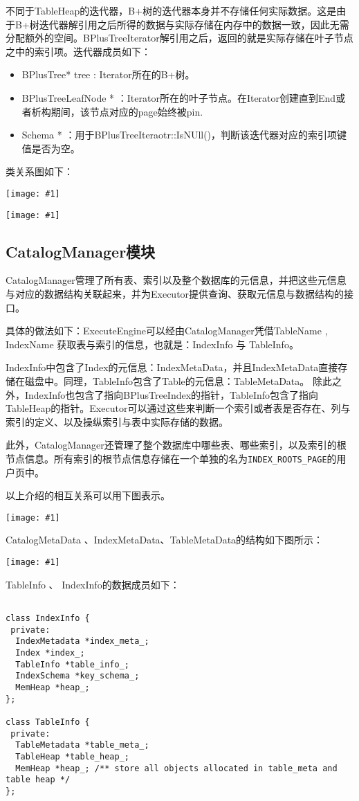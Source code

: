 \documentclass[12pt, a4paper]{article}
\def\c#1{\texttt{#1}}
\def\ss#1{\subsection{#1}}
\def\p{\par}
\def\g#1{\begin{center}\texttt{[image: \#1]}\end{center}}
\begin{document}
\p 不同于TableHeap的迭代器，B+树的迭代器本身并不存储任何实际数据。这是由于B+树迭代器解引用之后所得的数据与实际存储在内存中的数据一致，因此无需分配额外的空间。BPlusTreeIterator解引用之后，返回的就是实际存储在叶子节点之中的索引项。迭代器成员如下：
\begin{itemize}
  \item BPlusTree* tree : Iterator所在的B+树。
  \item BPlusTreeLeafNode * ：Iterator所在的叶子节点。在Iterator创建直到End或者析构期间，该节点对应的page始终被pin.
  \item Schema * ：用于BPlusTreeIteraotr::IsNUll()，判断该迭代器对应的索引项键值是否为空。
\end{itemize}
\p 类关系图如下：
\g{dots/b_plus_tree_index.pdf}
\g{dots/index_iterator.pdf}
\ss{CatalogManager模块}
\p CatalogManager管理了所有表、索引以及整个数据库的元信息，并把这些元信息与对应的数据结构关联起来，并为Executor提供查询、获取元信息与数据结构的接口。
\p 具体的做法如下：ExecuteEngine可以经由CatalogManager凭借TableName , IndexName 获取表与索引的信息，也就是：IndexInfo 与 TableInfo。
\p IndexInfo中包含了Index的元信息：IndexMetaData，并且IndexMetaData直接存储在磁盘中。同理，TableInfo包含了Table的元信息：TableMetaData。
除此之外，IndexInfo也包含了指向BPlusTreeIndex的指针，TableInfo包含了指向TableHeap的指针。Executor可以通过这些来判断一个索引或者表是否存在、列与索引的定义、以及操纵索引与表中实际存储的数据。
\p 此外，CatalogManager还管理了整个数据库中哪些表、哪些索引，以及索引的根节点信息。所有索引的根节点信息存储在一个单独的名为\c{INDEX\_ROOTS\_PAGE}的用户页中。
\p 以上介绍的相互关系可以用下图表示。
\g{catalog_manager.pdf}
\p CatalogMetaData 、IndexMetaData、TableMetaData的结构如下图所示：
\g{catalog_metadata.pdf}
\p TableInfo 、 IndexInfo的数据成员如下：
\begin{lstlisting}[style = customc]

class IndexInfo {
 private:
  IndexMetadata *index_meta_;
  Index *index_;
  TableInfo *table_info_;
  IndexSchema *key_schema_;
  MemHeap *heap_;
};

class TableInfo {
 private:
  TableMetadata *table_meta_;
  TableHeap *table_heap_;
  MemHeap *heap_; /** store all objects allocated in table_meta and table heap */
};

\end{lstlisting}
\end{document}

